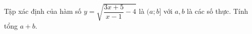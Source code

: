\begin{ex}
Tập xác định của hàm số $y=\sqrt{\dfrac{3x+5}{x-1}-4}$ là $(a;b]$ với $a,b$ là các số thực. Tính tổng $a+b$.
\end{ex}
